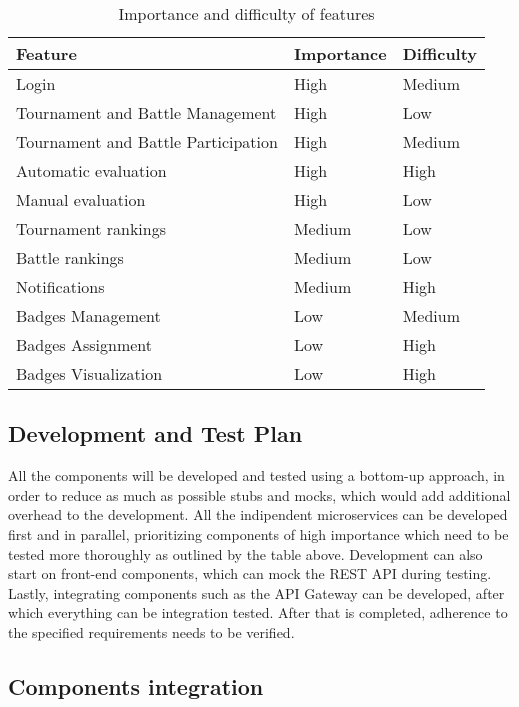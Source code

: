 \begin{table}[H]
     \centering
     \begin{tabular}{|l|l|l|}
          \hline
          \textbf{Feature}                    & \textbf{Importance} & \textbf{Difficulty} \\\hline
          Login                               & High                & Medium              \\
          Tournament and Battle Management    & High                & Low                 \\
          Tournament and Battle Participation & High                & Medium              \\
          Automatic evaluation                & High                & High                \\
          Manual evaluation                   & High                & Low                 \\
          Tournament rankings                 & Medium              & Low                 \\
          Battle rankings                     & Medium              & Low                 \\
          Notifications                       & Medium              & High                \\
          Badges Management                   & Low                 & Medium              \\
          Badges Assignment                   & Low                 & High                \\
          Badges Visualization                & Low                 & High                \\\hline
     \end{tabular}
     \caption{Importance and difficulty of features}
     \label{table:Importance and difficulty of features}
\end{table}

\subsection{Development and Test Plan}
All the components will be developed and tested using a bottom-up approach, in order to reduce as
much as possible stubs and mocks, which would add additional overhead to the development.
All the indipendent microservices can be developed first and in parallel, prioritizing components 
of high importance which need to be tested more thoroughly as outlined by the table above.
Development can also start on front-end components, which can mock the REST API during testing.
Lastly, integrating components such as the API Gateway can be developed, after which everything
can be integration tested. After that is completed, adherence to the specified requirements
needs to be verified.

\subsection{Components integration}

